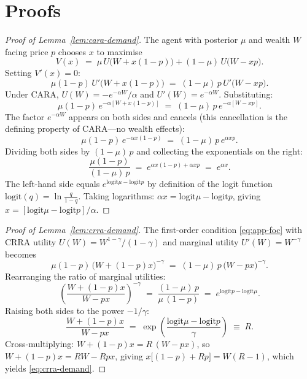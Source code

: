 \documentclass[12pt,letterpaper]{article}
\theoremstyle{definition}
\theoremstyle{remark}
\newcommand{\logit}{\mathrm{logit}}
\newcommand{\1}{\mathbf{1}}
\begin{document}



\appendix

\section{Proofs}\label{app:proofs}

\begin{proof}[Proof of Lemma~\ref{lem:cara-demand}]
The agent with posterior $\mu$ and wealth $W$ facing price $p$ chooses
$x$ to maximise
\[
   V(x) \;=\; \mu\,U\bigl(W+x(1-p)\bigr) + (1-\mu)\,U\bigl(W-xp\bigr).
\]
Setting $V'(x)=0$:
\begin{equation}
   \mu(1-p)\,U'\bigl(W+x(1-p)\bigr) \;=\; (1-\mu)\,p\,U'\bigl(W-xp\bigr).
\label{eq:app-foc}
\end{equation}
Under CARA, $U(W)=-e^{-\alpha W}/\alpha$ and $U'(W)=e^{-\alpha W}$.
Substituting:
\[
   \mu(1-p)\,e^{-\alpha[W+x(1-p)]} \;=\; (1-\mu)\,p\,e^{-\alpha[W-xp]}.
\]
The factor $e^{-\alpha W}$ appears on both sides and cancels (this
cancellation is the defining property of CARA---no wealth effects):
\[
   \mu(1-p)\,e^{-\alpha x(1-p)} \;=\; (1-\mu)\,p\,e^{\alpha xp}.
\]
Dividing both sides by $(1-\mu)\,p$ and collecting the exponentials on the
right:
\[
   \frac{\mu(1-p)}{(1-\mu)\,p}
   \;=\; e^{\alpha x(1-p)+\alpha xp}
   \;=\; e^{\alpha x}.
\]
The left-hand side equals $e^{\logit\mu-\logit p}$ by definition of the
logit function $\logit(q)=\ln\tfrac{q}{1-q}$. Taking logarithms:
$\alpha x = \logit\mu-\logit p$, giving
$x = [\logit\mu-\logit p]/\alpha$.
\end{proof}

\begin{proof}[Proof of Lemma~\ref{lem:crra-demand}]
The first-order condition \eqref{eq:app-foc} with CRRA utility
$U(W)=W^{1-\gamma}/(1-\gamma)$ and marginal utility $U'(W)=W^{-\gamma}$
becomes
\[
   \mu(1-p)\,\bigl(W+(1-p)x\bigr)^{-\gamma}
   \;=\; (1-\mu)\,p\,\bigl(W-px\bigr)^{-\gamma}.
\]
Rearranging the ratio of marginal utilities:
\[
   \left(\frac{W+(1-p)x}{W-px}\right)^{-\gamma}
   \;=\; \frac{(1-\mu)\,p}{\mu\,(1-p)}
   \;=\; e^{\logit p - \logit\mu}.
\]
Raising both sides to the power $-1/\gamma$:
\[
   \frac{W+(1-p)x}{W-px}
   \;=\; \exp\!\left(\frac{\logit\mu-\logit p}{\gamma}\right) \;\equiv\; R.
\]
Cross-multiplying: $W+(1-p)x = R\,(W-px)$, so
$W + (1-p)x = RW - Rpx$, giving
$x\bigl[(1-p)+Rp\bigr] = W(R-1)$, which yields
\eqref{eq:crra-demand}.
\end{proof}
\end{document}
